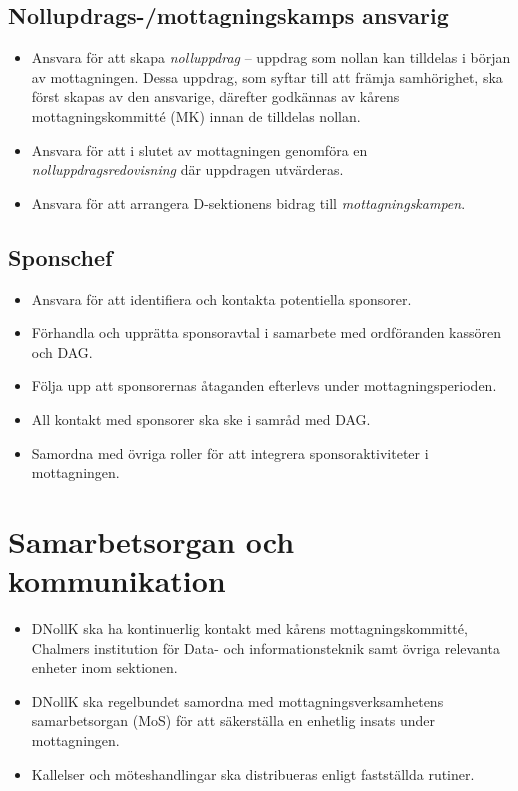 \documentclass[a4paper]{dtekinstruktion}
\begin{document}
\subsection{Nollupdrags-/mottagningskamps ansvarig}
\begin{itemize}
  \item Ansvara för att skapa \emph{nolluppdrag} – uppdrag som nollan kan tilldelas i början av mottagningen. Dessa uppdrag, som syftar till att främja samhörighet, ska först skapas av den ansvarige, därefter godkännas av kårens mottagningskommitté (MK) innan de tilldelas nollan.
  \item Ansvara för att i slutet av mottagningen genomföra en \emph{nolluppdragsredovisning} där uppdragen utvärderas.
  \item Ansvara för att arrangera D-sektionens bidrag till \emph{mottagningskampen}.
\end{itemize}

\subsection{Sponschef}
\begin{itemize}
  \item Ansvara för att identifiera och kontakta potentiella sponsorer.
  \item Förhandla och upprätta sponsoravtal i samarbete med ordföranden kassören och DAG.
  \item Följa upp att sponsorernas åtaganden efterlevs under mottagningsperioden.
  \item All kontakt med sponsorer ska ske i samråd med DAG.
  \item Samordna med övriga roller för att integrera sponsoraktiviteter i mottagningen.
\end{itemize}

\section{Samarbetsorgan och kommunikation}
\begin{itemize}
  \item DNollK ska ha kontinuerlig kontakt med kårens mottagningskommitté, Chalmers institution för Data- och informationsteknik samt övriga relevanta enheter inom sektionen.
  \item DNollK ska regelbundet samordna med mottagningsverksamhetens samarbetsorgan (MoS) för att säkerställa en enhetlig insats under mottagningen.
  \item Kallelser och möteshandlingar ska distribueras enligt fastställda rutiner.
\end{itemize}
\end{document}
